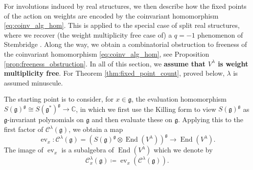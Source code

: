 \documentclass{amsart}
\newcommand{\C}{\mathbb{C}}
\newcommand{\Kir}{\mathcal{C}}
\newcommand{\End}{\operatorname{End}}
\newcommand{\ev}{\operatorname{ev}}
\newcommand{\g}{\mathfrak{g}}
\theoremstyle{definition}
\theoremstyle{plain}
\theoremstyle{remark}
\begin{document}
For involutions induced by real structures, we then describe how the fixed points of the action on weights are encoded by the coinvariant homomorphism \eqref{eq:coinv_alg_hom}. This is applied to the special case of split real structures, where we recover (the weight multiplicity free case of) a $q=-1$ phenomenon of Stembridge \cite{Stembridge1994_minuscule, Stembridge1996_canonical}. Along the way, we obtain a combinatorial obstruction to freeness of the coinvariant homomorphism \eqref{eq:coinv_alg_hom}, see Proposition \ref{prop:freeness_obstruction}. In all of this section, we \textbf{assume that $V^\lambda$ is weight multiplicity free}. For Theorem \ref{thm:fixed_point_count}, proved below, $\lambda$ is assumed minuscule.

The starting point is to consider, for $x\in \g$, the evaluation homomorphism $S(\g)^\g\cong S(\g^*)^\g\to \C$, in which we first use the Killing form to view $S(\g)^\g$ as $\g$-invariant polynomials on $\g$ and then evaluate these on $\g$. Applying this to the first factor of $\Kir^\lambda(\g)$, we obtain a map
$$
    \ev_x\colon \Kir^\lambda(\g)
    = (S(\g)^\g\otimes \End(V^\lambda))^\g
    \to
    \End(V^\lambda).
$$
The image of $\ev_x$ is a subalgebra of $\End(V^\lambda)$ which we denote by
$$
    \Kir^\lambda_x(\g)
    \coloneqq
    \ev_x(\Kir^\lambda(\g)).
$$
\end{document}
